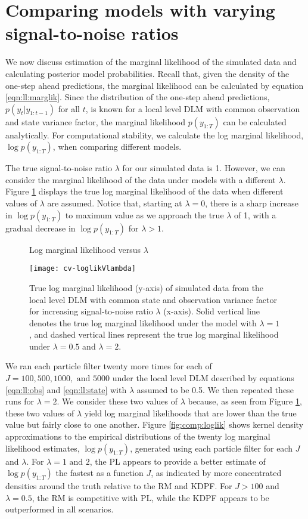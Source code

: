 \section{Comparing models with varying signal-to-noise ratios} \label{sec:comp:models}

We now discuss estimation of the marginal likelihood of the simulated data and calculating posterior model probabilities. Recall that, given the density of the one-step ahead predictions, the marginal likelihood can be calculated by equation \eqref{eqn:ll:marglik}. Since the distribution of the one-step ahead predictions, $p(y_t|y_{1:t-1})$ for all $t$, is known for a local level DLM with common observation and state variance factor, the marginal likelihood $p(y_{1:T})$ can be calculated analytically. For computational stability, we calculate the log marginal likelihood, $\log p(y_{1:T})$, when comparing different models.

The true signal-to-noise ratio $\lambda$ for our simulated data is 1. However, we can consider the marginal likelihood of the data under models with a different $\lambda$. Figure \ref{fig:comp:lambda} displays the true log marginal likelihood of the data when different values of $\lambda$ are assumed. Notice that, starting at $\lambda = 0$, there is a sharp increase in $\log p(y_{1:T})$ to maximum value as we approach the true $\lambda$ of 1, with a gradual decrease in $\log p(y_{1:T})$ for $\lambda > 1$.

\begin{figure}[ht]
\ssp
\centering
\caption{Log marginal likelihood versus $\lambda$} \label{fig:comp:lambda}
\texttt{[image: cv-loglikVlambda]}
\caption*{True log marginal likelihood (y-axis) of simulated data from the local level DLM with common state and observation variance factor for increasing signal-to-noise ratio $\lambda$ (x-axis). Solid vertical line denotes the true log marginal likelihood under the model with $\lambda = 1$, and dashed vertical lines represent the true log marginal likelihood under $\lambda = 0.5$ and $\lambda = 2$.}
\end{figure}

We ran each particle filter twenty more times for each of $J = 100, 500, 1000, \mbox{ and } 5000$ under the local level DLM described by equations \eqref{eqn:ll:obs} and \eqref{eqn:ll:state} with $\lambda$ assumed to be 0.5. We then repeated these runs for $\lambda = 2$. We consider these two values of $\lambda$ because, as seen from Figure \ref{fig:comp:lambda}, these two values of $\lambda$ yield log marginal likelihoods that are lower than the true value but fairly close to one another. Figure \ref{fig:comp:loglik} shows kernel density approximations to the empirical distributions of the twenty log marginal likelihood estimates, $\log p(y_{1:T})$, generated using each particle filter for each $J$ and $\lambda$. For $\lambda = 1 \mbox{ and } 2$, the PL appears to provide a better estimate of $\log p(y_{1:T})$ the fastest as a function $J$, as indicated by more concentrated densities around the truth relative to the RM and KDPF. For $J > 100$ and $\lambda = 0.5$, the RM is competitive with PL, while the KDPF appears to be outperformed in all scenarios.

